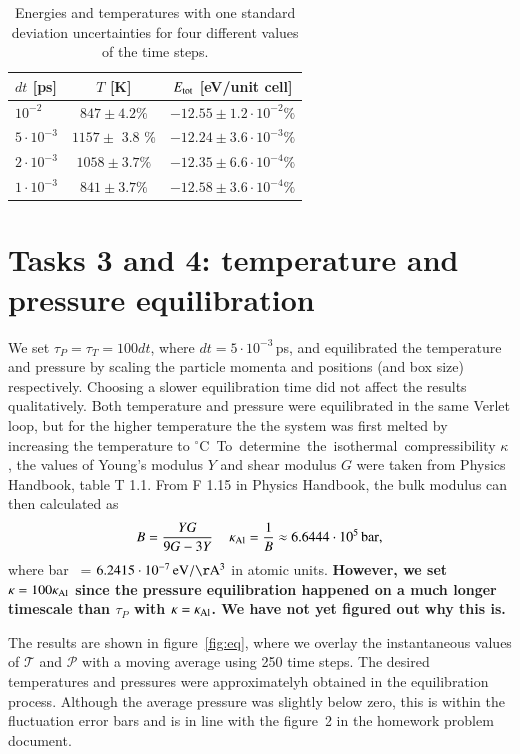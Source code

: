 \begin{table}[!ht]
  \begin{center}
    \caption{Energies and temperatures with one standard deviation uncertainties for four different values of the time steps.}
    \begin{tabular}{l c c} 
    $dt$ [ps] & $T$ [K] & $E_{\rm tot}$ [eV/unit cell]\\ \hline
$10^{-2}$ & 	$847 \pm 4.2\%$ &	$-12.55 \pm 1.2\cdot 10^{-2} \% $\\
$5\cdot 10^{-3}$ &	$1157 \pm$ 3.8 \% &$-12.24 \pm 3.6\cdot 10^{-3} \%$ \\
$2\cdot 10^{-3}$ & $1058  \pm 3.7 \% $ & 	$ -12.35 \pm 6.6\cdot 10^{-4} \% $\\ 
$1\cdot 10^{-3}$ & $ 841  \pm 3.7 \% $	 &$ -12.58 \pm 3.6\cdot 10^{-4} \%$ \\ 
      \hline
    \end{tabular}
    \label{tab:task2}
  \end{center}
\end{table}


\section*{Tasks 3 and 4: temperature and pressure equilibration}
We set $\tau_P = \tau_T = 100 dt$, where $dt = 5\cdot 10^{-3}$\,ps, and equilibrated the temperature and pressure by scaling the particle momenta and positions (and box size) respectively. Choosing a slower equilibration time did not affect the results qualitatively. Both temperature and pressure were equilibrated in the same Verlet loop, but for the higher temperature the the system was first melted by increasing the temperature to \unit[900]{$^\circ$C}. To determine the isothermal compressibility $\kappa$, 
the values of Young's modulus $Y$ and shear modulus $G$ were taken from Physics Handbook, table T 1.1. From F 1.15 in Physics Handbook, the bulk modulus can then calculated as
\begin{equation}
B = \frac{YG}{9G - 3Y} \,\quad \kappa_{\rm Al} = \frac{1}{B} \approx \unit[6.6444\cdot 10^5]{bar},
\end{equation}
where \unit[1]{bar } = $\unit[6.2415\cdot 10^{-7}]{eV/\AA^3}$ in atomic units. \textbf{However, we set $\kappa = 100 \kappa_{\rm Al}$ since the pressure equilibration happened on a much longer timescale than $\tau_P$ with $\kappa = \kappa_{\rm Al}$. We have not yet figured out why this is. }

The results are shown in figure~\ref{fig:eq}, where we overlay the instantaneous values of $\mathcal{T}$ and $\mathcal{P}$ with a moving average using 250 time steps. The desired temperatures and pressures were approximatelyh obtained in the equilibration process. Although  the average pressure was slightly below zero, this is within the fluctuation error bars and is in line with the figure~2 in the homework problem document. 

